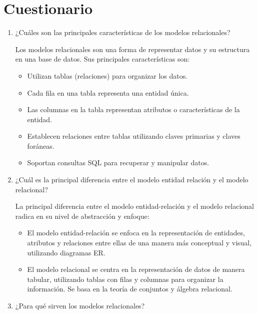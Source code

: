 \documentclass[a4paper,12pt]{article}
\begin{document}
\section*{Cuestionario}
\begin{enumerate}
    \item \textcolor{sun}{¿Cuáles son las principales características de los modelos relacionales?} 

    
    Los modelos relacionales son una forma de representar datos y su estructura en una base de datos. Sus principales características son:
    \begin{itemize}
        \item Utilizan tablas (relaciones) para organizar los datos.
        \item Cada fila en una tabla representa una entidad única.
        \item Las columnas en la tabla representan atributos o características de la entidad.
        \item Establecen relaciones entre tablas utilizando claves primarias y claves foráneas.        
        \item Soportan consultas SQL para recuperar y manipular datos.
    \end{itemize}

    \item \textcolor{sun}{¿Cuál es la principal diferencia entre el modelo entidad relación y el modelo relacional? } 
     
    La principal diferencia entre el modelo entidad-relación y el modelo relacional radica en su nivel de abstracción y enfoque:
    \begin{itemize}
        \item El modelo entidad-relación se enfoca en la representación de entidades, atributos y relaciones entre ellas de una manera más conceptual y visual, utilizando diagramas ER.
        \item El modelo relacional se centra en la representación de datos de manera tabular, utilizando tablas con filas y columnas para organizar la información. Se basa en la teoría de conjuntos y álgebra relacional.
    \end{itemize}

    \item \textcolor{sun}{¿Para qué sirven los modelos relacionales?} 


\end{enumerate}
\end{document}
